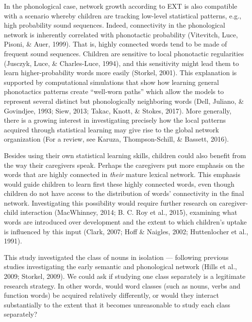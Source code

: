 \documentclass[english,floatsintext,man]{apa6}
\theoremstyle{definition}
\theoremstyle{definition}
\theoremstyle{definition}
\theoremstyle{remark}
\begin{document}
In the phonological case, network growth according to EXT is also
compatible with a scenario whereby children are tracking low-level
statistical patterns, e.g., high probability sound sequences. Indeed,
connectivity in the phonological network is inherently correlated with
phonotactic probability (Vitevitch, Luce, Pisoni, \& Auer, 1999). That
is, highly connected words tend to be made of frequent sound sequences.
Children are sensitive to local phonotactic regularities (Jusczyk, Luce,
\& Charles-Luce, 1994), and this sensitivity might lead them to learn
higher-probability words more easily (Storkel, 2001). This explanation
is supported by computational simulations that show how learning general
phonotactics patterns create \enquote{well-worn paths} which allow the
models to represent several distinct but phonologically neighboring
words (Dell, Juliano, \& Govindjee, 1993; Siew, 2013; Takac, Knott, \&
Stokes, 2017). More generally, there is a growing interest in
investigating precisely how the local patterns acquired through
statistical learning may give rise to the global network organization
(For a review, see Karuza, Thompson-Schill, \& Bassett, 2016).

Besides using their own statistical learning skills, children could also
benefit from the way their caregivers speak. Perhaps the caregivers put
more emphasis on the words that are highly connected in \emph{their}
mature lexical network. This emphasis would guide children to learn
first these highly connected words, even though children do not have
access to the distribution of words' connectivity in the final network.
Investigating this possibility would require further research on
caregiver-child interaction (MacWhinney, 2014; B. C. Roy et al., 2015),
examining what words are introduced over development and the extent to
which children's uptake is influenced by this input (Clark, 2007; Hoff
\& Naigles, 2002; Huttenlocher et al., 1991).

This study investigated the class of nouns in isolation --- following
previous studies investigating the early semantic and phonological
network (Hills et al., 2009; Storkel, 2009). We could ask if studying
one class separately is a legitimate research strategy. In other words,
would word classes (such as nouns, verbs and function words) be acquired
relatively differently, or would they interact substantially to the
extent that it becomes unreasonable to study each class separately?
\end{document}
